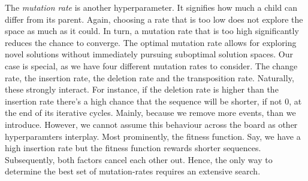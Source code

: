 \documentclass[./../../paper.tex]{subfiles}
\begin{document}
The \emph{mutation rate} is another hyperparameter. It signifies how much a child can differ from its parent. Again, choosing a rate that is too low does not explore the space as much as it could. In turn, a mutation rate that is too high significantly reduces the chance to converge. The optimal mutation rate allows for exploring novel solutions without immediately pursuing suboptimal solution spaces. Our case is special, as we have four different mutation rates to consider. The change rate, the insertion rate, the deletion rate and the transposition rate. Naturally, these strongly interact. For instance, if the deletion rate is higher than the insertion rate there's a high chance that the sequence will be shorter, if not 0, at the end of its iterative cycles. Mainly, because we remove more events, than we introduce. However, we cannot assume this behaviour across the board as other hyperparamters interplay. Most prominently, the fitness function. Say, we have a high insertion rate but the fitness function rewards shorter sequences. Subsequently, both factors cancel each other out. Hence, the only way to determine the best set of mutation-rates requires an extensive search.

\end{document}
